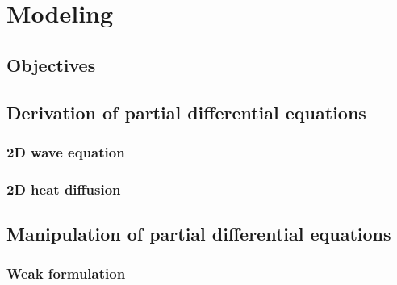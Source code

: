 \thispagestyle{empty}
\chapter{Modeling}
\label{modeling.chap}

\section{Objectives}

\section{Derivation of partial differential equations}

\subsection{2D wave equation}


\subsection{2D heat diffusion}



\section{Manipulation of partial differential equations}

\subsection{Weak formulation}

